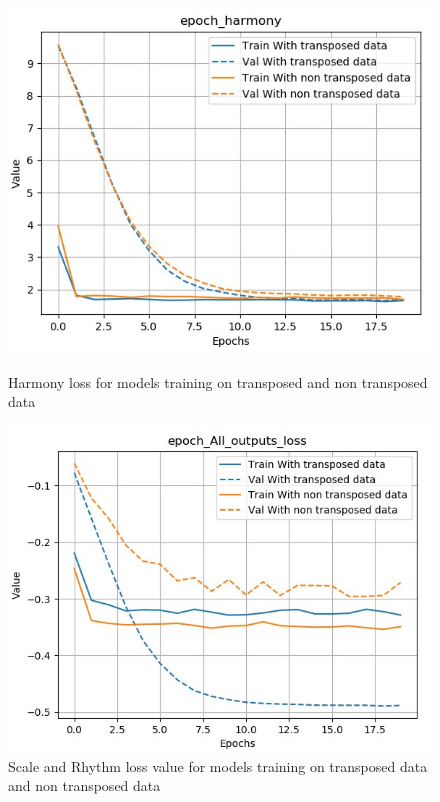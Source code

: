 \documentclass[12pt]{report}
\begin{document}
\begin{figure}[htbp]
    \begin{minipage}{0.5\textwidth}
        \begin{center}
            \includegraphics[width=\textwidth]{images/experiences/transpose-rnn/harmony-comparison-transpose.jpg}
            \caption{Harmony loss for models training on transposed and non transposed data}
            \label{fig:harmony-comparison-transpose}
        \end{center}
    \end{minipage} \hfill
    \begin{minipage}{0.5 \textwidth}
        \begin{center}
            \includegraphics[width=\textwidth]{images/experiences/transpose-rnn/all-outputs-comparison-transpose.jpg}
            \caption{Scale and Rhythm loss value for models training on transposed data and non transposed data}
            \label{fig:all-outputs-comparison-transpose}
        \end{center}
    \end{minipage}
\end{figure}
\end{document}
